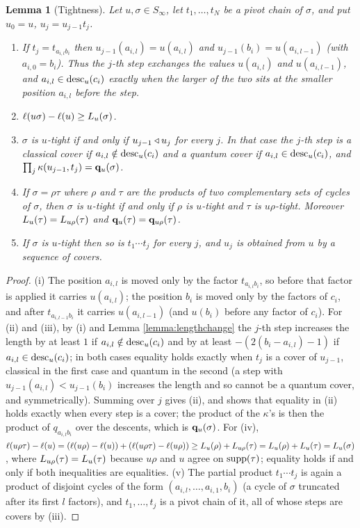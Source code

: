 \documentclass{amsart}
\newtheorem{lemma}{Lemma}[section]
\theoremstyle{definition}
\theoremstyle{remark}
\numberwithin{equation}{section}
\begin{document}
\begin{lemma}[Tightness] \label{lemma:tight}
Let $u,\sigma\in S_\infty$, let $t_1,\ldots,t_N$ be a pivot chain of $\sigma$, and put $u_0=u$, $u_j=u_{j-1}t_j$.
\begin{enumerate}
\item[(i)] If $t_j=t_{a_{i,l}b_i}$ then $u_{j-1}(a_{i,l})=u(a_{i,l})$ and $u_{j-1}(b_i)=u(a_{i,l-1})$ (with $a_{i,0}=b_i$). Thus the $j$-th step exchanges the values $u(a_{i,l})$ and $u(a_{i,l-1})$, and $a_{i,l}\in\mathrm{desc}_u(c_i)$ exactly when the larger of the two sits at the smaller position $a_{i,l}$ before the step.
\item[(ii)] $\ell(u\sigma)-\ell(u)\geq L_u(\sigma)$.
\item[(iii)] $\sigma$ is $u$-tight if and only if $u_{j-1}\triangleleft u_j$ for every $j$. In that case the $j$-th step is a classical cover if $a_{i,l}\notin\mathrm{desc}_u(c_i)$ and a quantum cover if $a_{i,l}\in\mathrm{desc}_u(c_i)$, and $\prod_j\kappa(u_{j-1},t_j)=\mathbf{q}_u(\sigma)$.
\item[(iv)] If $\sigma=\rho\tau$ where $\rho$ and $\tau$ are the products of two complementary sets of cycles of $\sigma$, then $\sigma$ is $u$-tight if and only if $\rho$ is $u$-tight and $\tau$ is $u\rho$-tight. Moreover $L_u(\tau)=L_{u\rho}(\tau)$ and $\mathbf{q}_u(\tau)=\mathbf{q}_{u\rho}(\tau)$.
\item[(v)] If $\sigma$ is $u$-tight then so is $t_1\cdots t_j$ for every $j$, and $u_j$ is obtained from $u$ by a sequence of covers.
\end{enumerate}
\end{lemma}
\begin{proof}
(i) The position $a_{i,l}$ is moved only by the factor $t_{a_{i,l}b_i}$, so before that factor is applied it carries $u(a_{i,l})$; the position $b_i$ is moved only by the factors of $c_i$, and after $t_{a_{i,l-1}b_i}$ it carries $u(a_{i,l-1})$ (and $u(b_i)$ before any factor of $c_i$). For (ii) and (iii), by (i) and Lemma \ref{lemma:lengthchange} the $j$-th step increases the length by at least $1$ if $a_{i,l}\notin\mathrm{desc}_u(c_i)$ and by at least $-(2(b_i-a_{i,l})-1)$ if $a_{i,l}\in\mathrm{desc}_u(c_i)$; in both cases equality holds exactly when $t_j$ is a cover of $u_{j-1}$, classical in the first case and quantum in the second (a step with $u_{j-1}(a_{i,l})<u_{j-1}(b_i)$ increases the length and so cannot be a quantum cover, and symmetrically). Summing over $j$ gives (ii), and shows that equality in (ii) holds exactly when every step is a cover; the product of the $\kappa$'s is then the product of $q_{a_{i,l}b_i}$ over the descents, which is $\mathbf{q}_u(\sigma)$. For (iv), $\ell(u\rho\tau)-\ell(u)=(\ell(u\rho)-\ell(u))+(\ell(u\rho\tau)-\ell(u\rho))\geq L_u(\rho)+L_{u\rho}(\tau)=L_u(\rho)+L_u(\tau)=L_u(\sigma)$, where $L_{u\rho}(\tau)=L_u(\tau)$ because $u\rho$ and $u$ agree on $\mathrm{supp}(\tau)$; equality holds if and only if both inequalities are equalities. (v) The partial product $t_1\cdots t_j$ is again a product of disjoint cycles of the form $(a_{i,l},\ldots,a_{i,1},b_i)$ (a cycle of $\sigma$ truncated after its first $l$ factors), and $t_1,\ldots,t_j$ is a pivot chain of it, all of whose steps are covers by (iii).
\end{proof}
\end{document}

